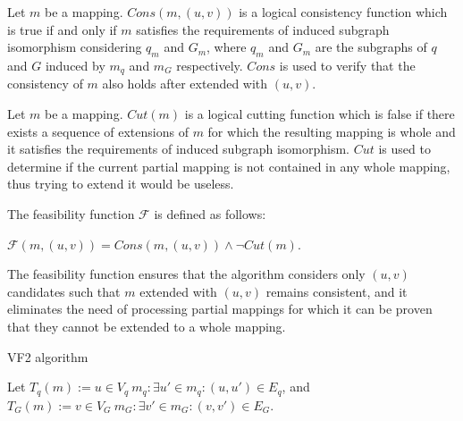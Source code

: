 \begin{definition}
    Let $m$ be a mapping. $Cons(m, (u, v))$ is a logical consistency function which is true if and only if $m$
    satisfies the requirements of induced subgraph isomorphism considering $q_m$ and $G_m$, where
    $q_m$ and $G_m$ are the subgraphs of $q$ and $G$ induced by $m_q$ and $m_G$
    respectively. $Cons$ is used to verify that the consistency of $m$ also holds after extended with $(u, v)$.
\end{definition}

\begin{definition}
    Let $m$ be a mapping. $Cut(m)$ is a logical cutting function which is false if there exists a 
    sequence of extensions of $m$ for which the resulting mapping is whole and it satisfies the
    requirements of induced subgraph isomorphism. $Cut$ is used to determine if the current partial 
    mapping is not contained in any whole mapping, thus trying to extend it would be useless.
\end{definition}

\begin{definition}
    The feasibility function $\mathcal{F}$ is defined as follows: 
    
    $\mathcal{F}(m, (u, v)) = Cons(m, (u, v)) \land \neg Cut(m)$.
\end{definition}

The feasibility function ensures that the algorithm considers only $(u, v)$ candidates such that 
$m$ extended with $(u, v)$ remains consistent, and it eliminates the need of processing partial
mappings for which it can be proven that they cannot be extended to a whole mapping.

\begin{algorithm}[h]
    \SetAlgoLined\DontPrintSemicolon
    \caption{VF2 algorithm}
\end{algorithm}

Let $T_q(m) := {u \in V_q \ m_q: \exists u' \in m_q: (u, u') \in E_q}$, and
$T_G(m) := {v \in V_G \ m_G: \exists v' \in m_G: (v, v') \in E_G}$.

